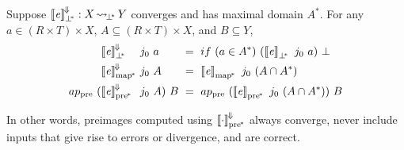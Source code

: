 \documentclass[preprint]{sigplanconf}
\newcommand{\arrow}{\rightsquigarrow}
\newcommand{\conv}{^{\mspace{-2mu}\Downarrow\mspace{-2mu}}}
\newcommand{\meaningofconv}[1]{\left\llbracket{#1}\right\rrbracket\conv}
\newcommand{\pre}{_\mathrm{pre}}
\newcommand{\pbot}{{\bot^{\mspace{-4mu}*}}}
\DeclareMathOperator{\pbotto}{\arrow_{\mspace{-3mu}\pbot}}
\newcommand{\pmap}{_\mathrm{map^{\mspace{-2mu}*}}}
\newcommand{\ppre}{_\mathrm{pre^{\mspace{-2mu}*}}}
\begin{document}
\begin{corollary}
Suppose $\meaningofconv{\mathit{e}}_\pbot : X \pbotto Y$ converges and has maximal domain $A^*$.
For any $a \in (R \times T) \times X$, $A \subseteq (R \times T) \times X$, and $B \subseteq Y$,
\begin{equation}
\begin{aligned}
	&\meaningofconv{\mathit{e}}_\pbot &&\!\!\!\!j_0~a &&\!\!\!\!= \ if~(a \in A^*)~(\meaningof{\mathit{e}}_\pbot~j_0~a)~\bot \\
	&\meaningofconv{\mathit{e}}\pmap &&\!\!\!\!j_0~A &&\!\!\!\!= \ \meaningof{\mathit{e}}\pmap~j_0~(A \i A^*) \\
	ap\pre~(\!&\meaningofconv{\mathit{e}}\ppre &&\!\!\!\!j_0~A)~B &&\!\!\!\!= \ ap\pre~(\meaningof{\mathit{e}}\ppre~j_0~(A \i A^*))~B
\end{aligned}
\end{equation}
\label{cor:correct-convergence}
\end{corollary}

In other words, preimages computed using $\meaningofconv{\cdot}\ppre$ always converge, never include inputs that give rise to errors or divergence, and are correct.
\end{document}
